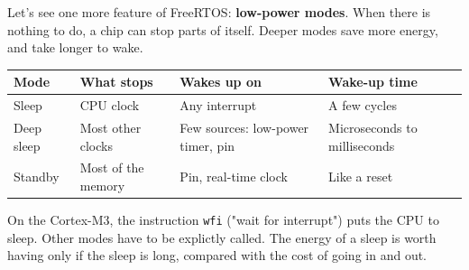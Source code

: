 \documentclass[a4paper,11pt]{article}
\begin{document}
Let's see one more feature of FreeRTOS: \textbf{low-power modes}.
When there is nothing to do, a chip can stop parts of itself. Deeper modes save more energy, and take longer to wake.

\begin{table}[ht]
    \centering
    \begin{tabular}{l|l|l|l}
        \textbf{Mode} & \textbf{What stops} & \textbf{Wakes up on} & \textbf{Wake-up time} \\
        \hline
        Sleep & CPU clock & Any interrupt & A few cycles \\
        Deep sleep & Most other clocks & Few sources: low-power timer, pin & Microseconds to milliseconds \\
        Standby & Most of the memory & Pin, real-time clock & Like a reset \\
    \end{tabular}
\end{table}

On the Cortex-M3, the instruction \texttt{wfi} ("wait for interrupt") puts the CPU to sleep.
Other modes have to be explictly called.
The energy of a sleep is worth having only if the sleep is long, compared with the cost of going in and out.
\end{document}

